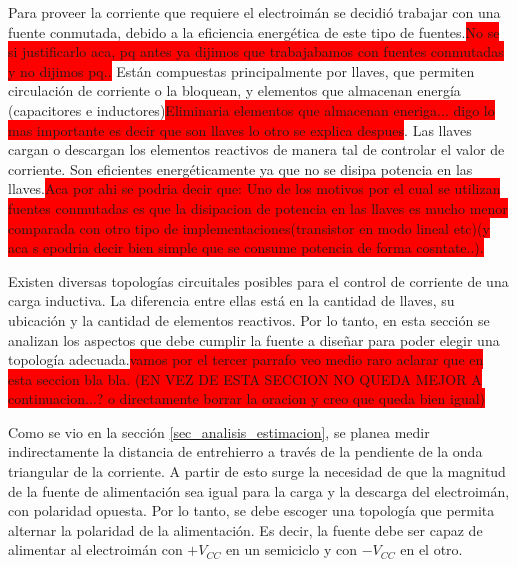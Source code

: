 
Para proveer la corriente que requiere el electroimán se decidió trabajar con una fuente conmutada, debido a la eficiencia energética de este tipo de fuentes.\colorbox{red}{No se si justificarlo aca, pq antes ya dijimos que trabajabamos con fuentes conmutadas y no dijimos pq..} Están compuestas principalmente por llaves, que permiten circulación de corriente o la bloquean, y elementos que almacenan energía (capacitores e inductores)\colorbox{red}{Eliminaria elementos que almacenan eneriga... digo lo mas importante es decir que son llaves lo otro se explica despues}. Las llaves cargan o descargan los elementos reactivos de manera tal de controlar el valor de corriente. Son eficientes energéticamente ya que no se disipa potencia en las llaves.\colorbox{red}{Aca por ahi se podria decir que: Uno de los motivos por el cual se utilizan fuentes conmutadas es que la disipacion de potencia en las llaves es mucho menor comparada con otro tipo de implementaciones(transistor en modo lineal etc)(y aca s epodria decir bien simple que se consume potencia de forma cosntate..).}

Existen diversas topologías circuitales posibles para el control de corriente de una carga inductiva. La diferencia entre ellas está en la cantidad de llaves, su ubicación y la cantidad de elementos reactivos. Por lo tanto, en esta sección se analizan los aspectos que debe cumplir la fuente a diseñar para poder elegir una topología adecuada.\colorbox{red}{vamos por el tercer parrafo veo medio raro aclarar que en esta seccion bla bla. (EN VEZ DE ESTA SECCION NO QUEDA MEJOR A continuacion...? o directamente borrar la oracion y creo que queda bien igual)}

Como se vio en la sección \ref{sec_analisis_estimacion}, se planea medir indirectamente la distancia de entrehierro a través de la pendiente de la onda triangular de la corriente. A partir de esto surge la necesidad de que la magnitud de la fuente de alimentación sea igual para la carga y la descarga del electroimán, con polaridad opuesta. Por lo tanto, se debe escoger una topología que permita alternar la polaridad de la alimentación. Es decir, la fuente debe ser capaz de alimentar al electroimán con $+V_{CC}$  en un semiciclo y con $-V_{CC}$ en el otro.

